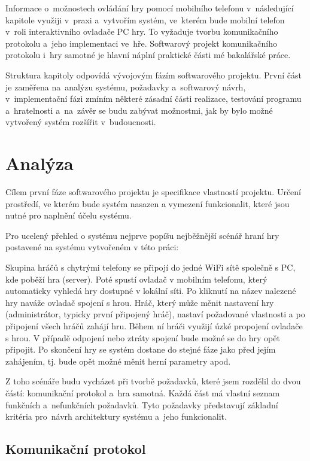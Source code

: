 \documentclass[thesis=B,czech,hidelinks]{FITthesis}[2012/06/26] %
\begin{document}
Informace o~možnostech ovládání hry pomocí mobilního telefonu v~následující kapitole využiji v~praxi a~vytvořím systém, ve~kterém bude mobilní telefon v~roli interaktivního ovladače PC hry. To vyžaduje tvorbu komunikačního protokolu a~jeho implementaci ve~hře. Softwarový projekt komunikačního protokolu i~hry samotné je hlavní náplní praktické části mé bakalářské práce.

Struktura kapitoly odpovídá vývojovým fázím softwarového projektu. \cite{si} První část je zaměřena na~analýzu systému, požadavky a~softwarový návrh, v~implementační fázi zmíním některé zásadní části realizace, testování programu a~hratelnosti a~na~závěr se budu zabývat možnostmi, jak by bylo možné vytvořený systém rozšířit v~budoucnosti.

\section{Analýza}

Cílem první fáze softwarového projektu je specifikace vlastností projektu. Určení prostředí, ve kterém bude systém nasazen a vymezení funkcionalit, které jsou nutné pro naplnění účelu systému.

Pro ucelený přehled o systému nejprve popíšu nejběžnější scénář hraní hry postavené na systému vytvořeném v této práci:

Skupina hráčů s chytrými telefony se připojí do jedné WiFi sítě společně s PC, kde poběží hra (server). Poté spustí ovladač v mobilním telefonu, který automaticky vyhledá hry dostupné v lokální síti. Po kliknutí na název nalezené hry naváže ovladač spojení s hrou. Hráč, který může měnit nastavení hry (administrátor, typicky první připojený hráč), nastaví požadované vlastnosti a po připojení všech hráčů zahájí hru. Během ní hráči využijí úzké propojení ovladače s hrou. V případě odpojení nebo ztráty spojení bude možné se do hry opět připojit. Po skončení hry se systém dostane do stejné fáze jako před jejím zahájením, tj. bude opět možné měnit herní parametry apod.

Z toho scénáře budu vycházet při tvorbě požadavků, které jsem rozdělil do dvou částí: komunikační protokol a~hra samotná. Každá část má vlastní seznam funkčních a~nefunkčních požadavků. Tyto požadavky představují základní kritéria pro~návrh architektury systému a~jeho funkcionalit.

\subsection{Komunikační protokol}
\end{document}
